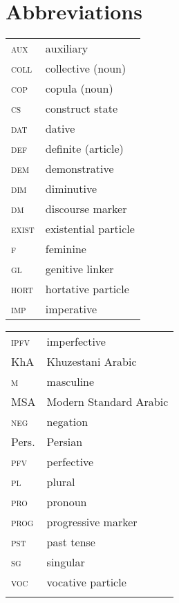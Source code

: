 \documentclass[output=paper,colorlinks,citecolor=brown,draftmode]{langscibook}
\begin{document}
\section*{Abbreviations}
\begin{tabularx}{.45\textwidth}{lQ}
\textsc{aux} & {auxiliary} \\
\textsc{coll} & collective (noun) \\
\textsc{cop} & {copula} (noun) \\
\textsc{cs} & construct state \\
\textsc{dat} & {dative} \\
\textsc{def} & definite (article) \\
\textsc{dem} & demonstrative \\
\textsc{dim} & diminutive \\
\textsc{dm} & discourse marker \\
\textsc{exist} & existential particle \\
\textsc{f} & feminine \\
\textsc{gl} & genitive linker \\
\textsc{hort} & hortative particle \\
\textsc{imp} & imperative \\
\end{tabularx}
\begin{tabularx}{.45\textwidth}{lQ}
\textsc{ipfv} & imperfective \\
KhA & Khuzestani Arabic \\
\textsc{m} & masculine \\
MSA & Modern Standard Arabic \\
\textsc{neg} & negation \\
Pers. & Persian \\
\textsc{pfv} & perfective \\
\textsc{pl} & plural \\
\textsc{pro} & {pronoun} \\
\textsc{prog} & progressive marker \\
\textsc{pst} & past tense \\
\textsc{sg} & singular \\
\textsc{voc} & vocative particle  \\
\\
\end{tabularx}






{\sloppy\printbibliography[heading=subbibliography,notkeyword=thi]}
\end{document}
